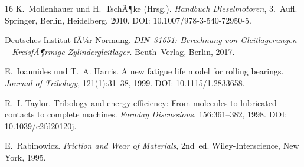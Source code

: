 ﻿\documentclass[12pt,a4paper]{article}
\begin{document}
\begin{thebibliography}{16}
  K.~Mollenhauer und H.~TschÃ¶ke (Hrsg.).
  \textit{Handbuch Dieselmotoren}, 3.~Aufl.
  Springer, Berlin, Heidelberg, 2010.
  DOI: 10.1007/978-3-540-72950-5.

  Deutsches Institut fÃ¼r Normung.
  \textit{DIN~31651: Berechnung von Gleitlagerungen -- KreisfÃ¶rmige Zylindergleitlager}.
  Beuth~Verlag, Berlin, 2017.

  E.~Ioannides und T.~A. Harris.
  A new fatigue life model for rolling bearings.
  \textit{Journal of Tribology}, 121(1):31--38, 1999.
  DOI: 10.1115/1.2833658.

  R.~I. Taylor.
  Tribology and energy efficiency: From molecules to lubricated contacts to complete machines.
  \textit{Faraday Discussions}, 156:361--382, 1998.
  DOI: 10.1039/c2fd20120j.

  E.~Rabinowicz.
  \textit{Friction and Wear of Materials}, 2nd~ed.
  Wiley-Interscience, New York, 1995.

\end{thebibliography}
\end{document}
